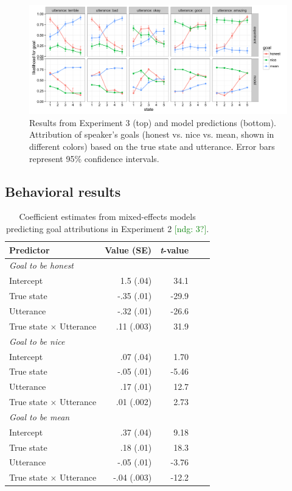 \documentclass[10pt,letterpaper]{article}
\newcommand{\ndg}[1]{\textcolor{Green}{[ndg: #1]}}
\begin{document}
\begin{figure}[t]
\begin{center} 
  \includegraphics[width=.9\textwidth]{figures/exp2.pdf}
  \caption{\label{fig:exp2} Results from Experiment 3 (top) and model predictions (bottom). Attribution of speaker's goals (honest vs. nice vs. mean, shown in different colors) based on the true state and utterance. Error bars represent 95\% confidence intervals.}
  \end{center} 
\end{figure}

\subsection{Behavioral results}

\begin{table}[t]
\caption{\label{tab:lmer1}  Coefficient estimates from mixed-effects models predicting goal attributions in Experiment 2 \ndg{3?}.} 
\begin{center} 
\begin{tabular}{l r r r l} 
\hline
Predictor  &  Value (SE) & \emph{t}-value\\
\hline
\emph{Goal to be honest} \\
Intercept  & 1.5 (.04) & 34.1 \\
True state & -.35 (.01) &  -29.9 \\
Utterance & -.32 (.01) & -26.6 \\
True state $\times$ Utterance & .11 (.003) & 31.9 \\
\emph{Goal to be nice} \\
Intercept  & .07 (.04) & 1.70\\
True state & -.05 (.01) &  -5.46 \\
Utterance & .17 (.01) & 12.7 \\
True state $\times$ Utterance & .01 (.002) & 2.73 \\
\emph{Goal to be mean} \\ 
Intercept  & .37 (.04) & 9.18 \\
True state & .18 (.01) &  18.3 \\
Utterance & -.05 (.01) & -3.76 \\
True state $\times$ Utterance & -.04 (.003) & -12.2 \\
\hline
\end{tabular} 
\end{center} 
\end{table}
\end{document}
